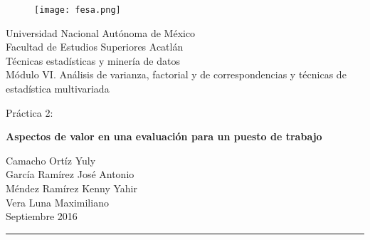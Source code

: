 \begin{titlepage}
\begin{center}
\vspace*{0in}

\begin{figure}[htb]
\centering
\texttt{[image: fesa.png]}
\end{figure}
\vspace*{0.25in}
\large{Universidad Nacional Autónoma de México}\\
\vspace*{0.5in}
Facultad de Estudios Superiores Acatlán\\
\vspace*{0.5in}
Técnicas estadísticas y minería de datos\\
\vspace*{0.5in}
Módulo VI. Análisis de varianza, factorial y de correspondencias y técnicas de estadística multivariada \\
\vspace*{0.5in}
\begin{large}
Práctica 2: \\
\end{large}
\vspace*{0.2in}
\begin{Large}
\textbf{Aspectos de valor en una evaluación para un puesto de trabajo} \\
\end{Large}
\vspace*{0.5in}
Camacho Ortíz Yuly \\
García Ramírez José Antonio \\
Méndez Ramírez Kenny Yahir \\
Vera Luna Maximiliano \\ 
\vspace*{1in}
Septiembre 2016 \\
\vspace*{0.05in}
\rule{80mm}{0.1mm}\\
\vspace*{0.1in}
\begin{Large}

\end{Large}
\end{center}

\end{titlepage}

\newpage 
\tableofcontents{}
\newpage